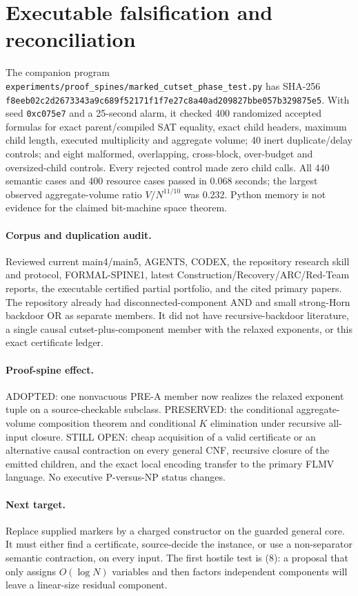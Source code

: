\documentclass[11pt]{article}
\begin{document}
\section{Executable falsification and reconciliation}
The companion program
\texttt{experiments/proof\_spines/marked\_cutset\_phase\_test.py} has SHA-256
\nolinkurl{f8eeb02c2d2673343a9c689f52171f1f7e27c8a40ad209827bbe057b329875e5}.
With seed \texttt{0xc075e7} and a 25-second alarm, it checked 400 randomized
accepted formulas for exact parent/compiled SAT equality, exact child headers,
maximum child length, executed multiplicity and aggregate volume; 40 inert
duplicate/delay controls; and eight malformed, overlapping, cross-block,
over-budget and oversized-child controls.  Every rejected control made zero
child calls.  All 440 semantic cases and 400 resource cases passed in 0.068
seconds; the largest observed aggregate-volume ratio
$V/N^{11/10}$ was 0.232.  Python memory is not evidence for the claimed
bit-machine space theorem.

\paragraph{Corpus and duplication audit.}
Reviewed current main4/main5, AGENTS, CODEX, the repository research skill and
protocol, FORMAL-SPINE1, latest Construction/Recovery/ARC/Red-Team reports,
the executable certified partial portfolio, and the cited primary papers.
The repository already had disconnected-component AND and small strong-Horn
backdoor OR as separate members.  It did not have recursive-backdoor
literature, a single causal cutset-plus-component member with the relaxed
exponents, or this exact certificate ledger.

\paragraph{Proof-spine effect.}
ADOPTED: one nonvacuous PRE-A member now realizes the relaxed exponent tuple
on a source-checkable subclass.  PRESERVED: the conditional aggregate-volume
composition theorem and conditional $K$ elimination under recursive all-input
closure.  STILL OPEN: cheap acquisition of a valid certificate or an
alternative causal contraction on every general CNF, recursive closure of
the emitted children, and the exact local encoding transfer to the primary
FLMV language.  No executive P-versus-NP status changes.

\paragraph{Next target.}
Replace supplied markers by a charged constructor on the guarded general
core.  It must either find a certificate, source-decide the instance, or use a
non-separator semantic contraction, on every input.  The first hostile test is
(8): a proposal that only assigns $O(\log N)$ variables and then factors
independent components will leave a linear-size residual component.

\end{document}
